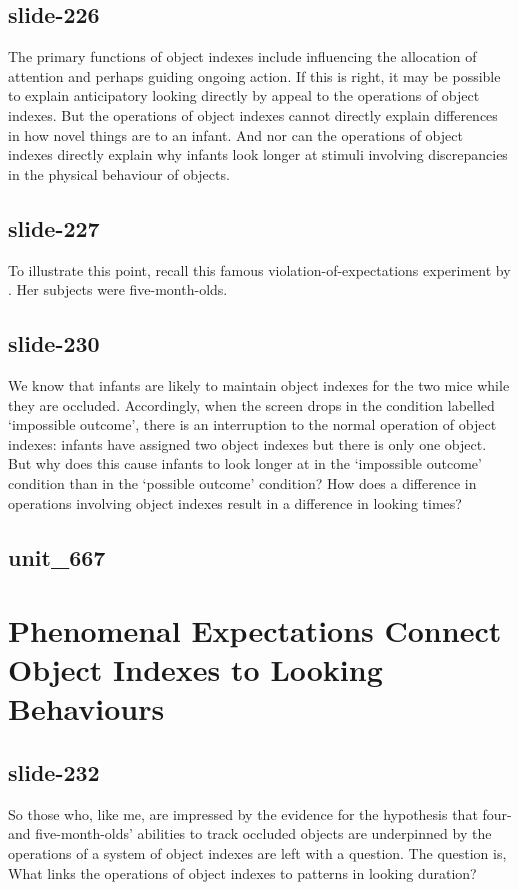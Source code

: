 \documentclass[12pt,\papersize]{extarticle}
\begin{document}
\subsection{slide-226}
The primary functions of object indexes include influencing the allocation
of attention and perhaps guiding ongoing action.
If this is right, it may be possible to explain anticipatory looking
directly by appeal to the operations of  object indexes.
But the operations of object indexes cannot directly explain differences
in how novel things are to an infant.
And nor can the operations of object indexes directly explain why infants
look longer at stimuli involving discrepancies in the physical behaviour
of objects.

\subsection{slide-227}
To illustrate this point, recall this famous violation-of-expectations
experiment by \citet{wynn:1992_addition}.
Her subjects were five-month-olds.

\subsection{slide-230}
We know that infants are likely to maintain object indexes for the two
mice while they are occluded.
Accordingly, when the screen drops in the condition labelled
‘impossible outcome’, there is an interruption to the normal
operation of object indexes: infants have assigned two object indexes
but there is only one object.
But why does this cause infants to look longer at in the
‘impossible outcome’ condition than in the ‘possible outcome’ condition?
How does a difference in operations involving object indexes result
in a difference in looking times?

\subsection{unit\_667}


\section{Phenomenal Expectations Connect Object Indexes to Looking Behaviours}

\subsection{slide-232}
So those who, like me, are impressed by the evidence for the hypothesis
that four- and five-month-olds’ abilities to track occluded objects
are underpinned by the operations of a system of object indexes
are left with a question.
The question is, What links the operations of object indexes to
patterns in looking duration?
\end{document}
